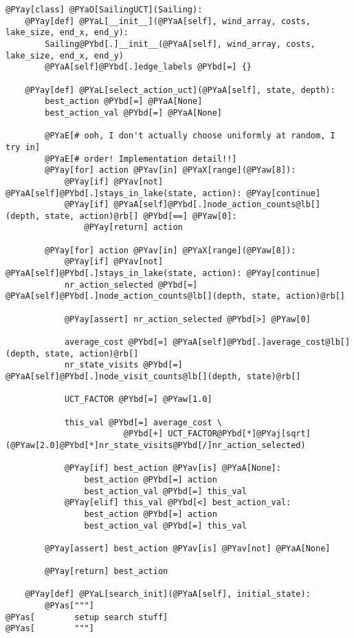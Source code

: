 \begin{Verbatim}[commandchars=@\[\]]
@PYay[class] @PYaO[SailingUCT](Sailing):
    @PYay[def] @PYaL[__init__](@PYaA[self], wind_array, costs, lake_size, end_x, end_y):
        Sailing@PYbd[.]__init__(@PYaA[self], wind_array, costs, lake_size, end_x, end_y)
        @PYaA[self]@PYbd[.]edge_labels @PYbd[=] {}

    @PYay[def] @PYaL[select_action_uct](@PYaA[self], state, depth):
        best_action @PYbd[=] @PYaA[None]
        best_action_val @PYbd[=] @PYaA[None]

        @PYaE[# ooh, I don't actually choose uniformly at random, I try in]
        @PYaE[# order! Implementation detail!!]
        @PYay[for] action @PYav[in] @PYaX[range](@PYaw[8]):
            @PYay[if] @PYav[not] @PYaA[self]@PYbd[.]stays_in_lake(state, action): @PYay[continue]
            @PYay[if] @PYaA[self]@PYbd[.]node_action_counts@lb[](depth, state, action)@rb[] @PYbd[==] @PYaw[0]:
                @PYay[return] action

        @PYay[for] action @PYav[in] @PYaX[range](@PYaw[8]):
            @PYay[if] @PYav[not] @PYaA[self]@PYbd[.]stays_in_lake(state, action): @PYay[continue]
            nr_action_selected @PYbd[=] @PYaA[self]@PYbd[.]node_action_counts@lb[](depth, state, action)@rb[]

            @PYay[assert] nr_action_selected @PYbd[>] @PYaw[0]

            average_cost @PYbd[=] @PYaA[self]@PYbd[.]average_cost@lb[](depth, state, action)@rb[]
            nr_state_visits @PYbd[=] @PYaA[self]@PYbd[.]node_visit_counts@lb[](depth, state)@rb[]

            UCT_FACTOR @PYbd[=] @PYaw[1.0]

            this_val @PYbd[=] average_cost \
                        @PYbd[+] UCT_FACTOR@PYbd[*]@PYaj[sqrt](@PYaw[2.0]@PYbd[*]nr_state_visits@PYbd[/]nr_action_selected)

            @PYay[if] best_action @PYav[is] @PYaA[None]:
                best_action @PYbd[=] action
                best_action_val @PYbd[=] this_val
            @PYay[elif] this_val @PYbd[<] best_action_val:
                best_action @PYbd[=] action
                best_action_val @PYbd[=] this_val

        @PYay[assert] best_action @PYav[is] @PYav[not] @PYaA[None]

        @PYay[return] best_action

    @PYay[def] @PYaL[search_init](@PYaA[self], initial_state):
        @PYas["""]
@PYas[        setup search stuff]
@PYas[        """]


\end{Verbatim}
